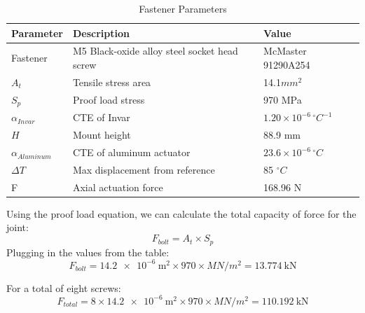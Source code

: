 \documentclass[12pt, letterpaper]{report}%
\newcommand{\degC}{^{\circ}C}    %
\begin{document}
        \begin{table}[H]
                \centering
                \caption{Fastener Parameters}
                \label{tab:fastener_parameters}
                \begin{tabularx}{\textwidth}{l X l}
                    \toprule
                    \textbf{Parameter} & \textbf{Description} & \textbf{Value} \\
                    \midrule
                    Fastener &
                    M5 Black-oxide alloy steel socket head screw &
                    McMaster 91290A254
                        \\\addlinespace
                    $A_t$ &
                    Tensile stress area &
                    14.1$mm^2$
                    \\\addlinespace
                    $S_p$ &
                    Proof load stress &
                    970 MPa
                    \\\addlinespace
                    $\alpha_{Invar}$ &
                    CTE of Invar &
                    $1.20 \times 10^{-6} \, \degC^{-1}$
                    \\\addlinespace
                    $H$ &
                    Mount height &
                    88.9 mm
                    \\\addlinespace
                    $\alpha_{Aluminum}$ &
                    CTE of aluminum actuator &
                    $23.6 \times 10^{-6} \, \degC$
                        \\\addlinespace
                    $\Delta{T}$ &
                    Max displacement from reference &
                    85 $\degC$
                    \\\addlinespace
                    F &
                    Axial actuation force &
                    168.96 N
                    \\\bottomrule
                \end{tabularx}
            \end{table}

        Using the proof load equation, we can calculate the total capacity of force for the joint:
        \[ F_{bolt} = A_t \times S_p \]
        Plugging in the values from the table:
        \[ F_{bolt} = \SI{14.2e-6}{\metre\squared} \times 970 \times {MN/m^2} = 13.774 \ \text{kN} \]

        For a total of eight screws:
         \[ F_{total} = 8 \times \SI{14.2e-6}{\metre\squared} \times 970 \times {MN/m^2} = 110.192 \ \text{kN} \]
\end{document}
